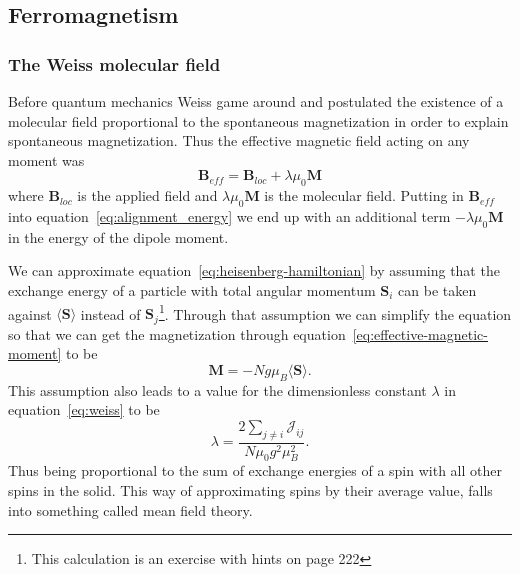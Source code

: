 \documentclass[11pt]{article}
\begin{document}
\subsection{Ferromagnetism}
\subsubsection{The Weiss molecular field}
Before quantum mechanics Weiss game around and postulated the existence of a molecular field proportional to the spontaneous magnetization in order to explain spontaneous magnetization. Thus the effective magnetic field acting on any moment was
\begin{equation}
	\pmb{B}_{eff} = \pmb{B}_{loc} + \lambda \mu_0 \pmb{M}
	\label{eq:weiss}
\end{equation}
where $\pmb{B}_{loc}$ is the applied field and $\lambda \mu_0 \pmb{M}$ is the molecular field. Putting in $\pmb{B}_{eff}$ into equation~\ref{eq:alignment_energy} we end up with an additional term $-\lambda \mu_0 \pmb{M}$ in the energy of the dipole moment.

We can approximate equation~\ref{eq:heisenberg-hamiltonian} by assuming that the exchange energy of a particle with total angular momentum $\pmb{S}_i$ can be taken against $\langle \pmb{S} \rangle$ instead of $\pmb{S}_j$\footnote{This calculation is an exercise with hints on page 222}. Through that assumption we can simplify the equation so that we can get the magnetization through equation~\ref{eq:effective-magnetic-moment} to be
\begin{equation}
	\pmb{M} = - Ng \mu_B \langle \pmb{S} \rangle.
\end{equation}
This assumption also leads to a value for the dimensionless constant $\lambda$ in equation~\ref{eq:weiss} to be
\begin{equation}
	\lambda = \frac{2 \sum_{j \neq i} \mathscr{J}_{ij}}{N \mu_0 g^2 \mu_B^2}.
\end{equation}
Thus being proportional to the sum of exchange energies of a spin with all other spins in the solid. This way of approximating spins by their average value, falls into something called mean field theory. 
\end{document}
